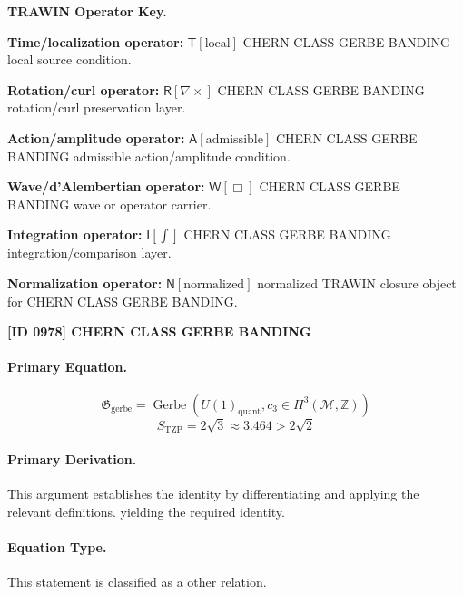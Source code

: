 \par\vspace{0.45\baselineskip}
\noindent\begin{minipage}[t]{\linewidth}
\begingroup
\small
\raggedright
\textbf{TRAWIN Operator Key.}\par
\noindent\textbf{Time/localization operator:} $\mathsf{T}\!\left[\mathrm{local}\right]$ CHERN CLASS GERBE BANDING local source condition.\par
\noindent\textbf{Rotation/curl operator:} $\mathsf{R}\!\left[\nabla\times\right]$ CHERN CLASS GERBE BANDING rotation/curl preservation layer.\par
\noindent\textbf{Action/amplitude operator:} $\mathsf{A}\!\left[\mathrm{admissible}\right]$ CHERN CLASS GERBE BANDING admissible action/amplitude condition.\par
\noindent\textbf{Wave/d'Alembertian operator:} $\mathsf{W}\!\left[\Box\right]$ CHERN CLASS GERBE BANDING wave or operator carrier.\par
\noindent\textbf{Integration operator:} $\mathsf{I}\!\left[\int\right]$ CHERN CLASS GERBE BANDING integration/comparison layer.\par
\noindent\textbf{Normalization operator:} $\mathsf{N}\!\left[\mathrm{normalized}\right]$ normalized TRAWIN closure object for CHERN CLASS GERBE BANDING.\par
\endgroup
\end{minipage}

\clearpage
\noindent\textbf{[ID 0978] CHERN CLASS GERBE BANDING}\par
\vspace{0.35em}
\paragraph{Primary Equation.}
\[
\mathfrak{G}_{\mathrm{gerbe}}=\operatorname{Gerbe}\!\left(U(1)_{\mathrm{quant}},c_3\in H^3(\mathcal{M},\mathbb{Z})\right)
\]
\[
S_{\mathrm{TZP}}=2\sqrt{3}\approx 3.464>2\sqrt{2}
\]

\paragraph{Primary Derivation.}
This argument establishes the identity by differentiating and applying the relevant definitions. yielding the required identity.
\paragraph{Equation Type.}
This statement is classified as a other relation.

